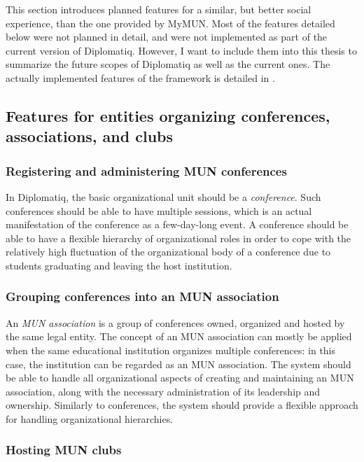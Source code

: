 This section introduces planned features for a similar, but better social experience, than the one provided by MyMUN. Most of the features detailed below were not planned in detail, and were not implemented as part of the current version of Diplomatiq. However, I want to include them into this thesis to summarize the future scopes of Diplomatiq as well as the current ones. The actually implemented features of the framework is detailed in .

\subsection{Features for entities organizing conferences, associations, and clubs}

\subsubsection{Registering and administering MUN conferences}

In Diplomatiq, the basic organizational unit should be a \emph{conference}. Such conferences should be able to have multiple sessions, which is an actual manifestation of the conference as a few-day-long event. A conference should be able to have a flexible hierarchy of organizational roles in order to cope with the relatively high fluctuation of the organizational body of a conference due to students graduating and leaving the host institution.

\subsubsection{Grouping conferences into an MUN association}

An \emph{MUN association} is a group of conferences owned, organized and hosted by the same legal entity. The concept of an MUN association can mostly be applied when the same educational institution organizes multiple conferences: in this case, the institution can be regarded as an MUN association. The system should be able to handle all organizational aspects of creating and maintaining an MUN association, along with the necessary administration of its leadership and ownership. Similarly to conferences, the system should provide a flexible approach for handling organizational hierarchies.

\subsubsection{Hosting MUN clubs}

